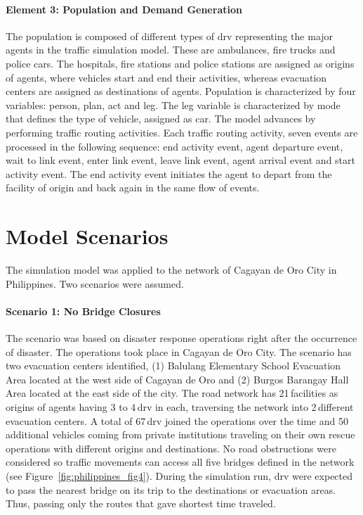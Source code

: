 \paragraph{Element 3: Population and Demand Generation}
The population is composed of different types of \gls{drv} representing the major agents in the traffic simulation model. These are ambulances, fire trucks and police cars.  The hospitals, fire stations and police stations are assigned as origins of agents, where vehicles start and end their activities, whereas evacuation centers are assigned as destinations of agents. Population is characterized by four variables: person, plan, act and leg. The leg variable is characterized by mode that defines the type of vehicle, assigned as car. The model advances by performing traffic routing activities. Each traffic routing activity, seven events are processed in the following sequence: end activity event, agent departure event, wait to link event, enter link event, leave link event, agent arrival event and start activity event. The end activity event initiates the agent to depart from the facility of origin and back again in the same flow of events. 

\section{Model Scenarios} 
The simulation model was applied to the network of Cagayan de Oro City in Philippines. Two scenarios were assumed.

\paragraph{Scenario 1: No Bridge Closures}
The scenario was based on disaster response operations right after the occurrence of disaster. The operations took place in Cagayan de Oro City. The scenario has two evacuation centers identified, (1) Balulang Elementary School Evacuation Area located at the west side of Cagayan de Oro and (2) Burgos Barangay Hall Area located at the east side of the city. The road network has 21\,facilities as origins of agents having 3 to 4\,\gls{drv} in each, traversing the network into 2\,different evacuation centers. A total of 67\,\gls{drv} joined the operations over the time and 50\,additional vehicles coming from private institutions traveling on their own rescue operations with different origins and destinations. No road obstructions were considered so traffic movements can access all five bridges defined in the network (see Figure~\ref{fig:philippines_fig4}). During the simulation run, \gls{drv} were expected to pass the nearest bridge on its trip to the destinations or evacuation areas. Thus, passing only the routes that gave shortest time traveled.

